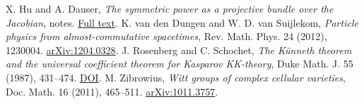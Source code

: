 \documentclass[11pt,oneside]{article}
\newcommand{\paperlink}[2]{\href{#1}{#2}}
\begin{document}
\begin{thebibliography}{99}
 X. Hu and A. Dauser, \emph{The symmetric power as a projective bundle over the Jacobian}, notes. \paperlink{https://people.math.ethz.ch/~rahul/Projective_bundle_over_Jacobian.pdf}{Full text}.
 K. van den Dungen and W. D. van Suijlekom, \emph{Particle physics from almost-commutative spacetimes}, Rev. Math. Phys. 24 (2012), 1230004. \paperlink{https://arxiv.org/abs/1204.0328}{arXiv:1204.0328}.
 J. Rosenberg and C. Schochet, \emph{The K\"unneth theorem and the universal coefficient theorem for Kasparov KK-theory}, Duke Math. J. 55 (1987), 431--474. \paperlink{https://doi.org/10.1215/S0012-7094-87-05524-4}{DOI}.
 M. Zibrowius, \emph{Witt groups of complex cellular varieties}, Doc. Math. 16 (2011), 465--511. \paperlink{https://arxiv.org/abs/1011.3757}{arXiv:1011.3757}.
\end{thebibliography}
\end{document}

